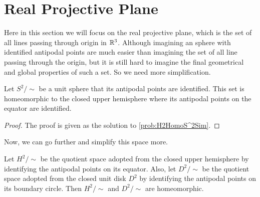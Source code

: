 \section{Real Projective Plane}
Here in this section we will focus on the real projective plane, which is the set of all lines passing through origin in $ \mathbb{R}^3 $. Although imagining an sphere with identified antipodal points are much easier than imagining the set of all line passing through the origin, but it is still hard to imagine the final geometrical and global properties of such a set. So we need more simplification.

\begin{proposition}
	\label{prop:UnitSphereHomoToUpperHemisphere}
	Let $ S^2/\sim $ be a unit sphere that its antipodal points are identified. This set is homeomorphic to the closed upper hemisphere where its antipodal points on the equator are identified.
\end{proposition}
\begin{proof}
	The proof is given as the solution to \autoref{prob:H2HomoS^2Sim}.
\end{proof}

Now, we can go further and simplify this space more.

\begin{proposition}
	\label{prop:H^2HomoToD^2Sim}
	Let $ H^2/\sim $ be the quotient space adopted from the closed upper hemisphere by identifying the antipodal points on its equator. Also, let $ D^2/\sim $ be the quotient space adopted from the closed unit disk $ D^2 $ by identifying the antipodal points on its boundary circle. Then $ H^2/\sim $ and $ D^2/\sim $ are homeomorphic.
\end{proposition}


